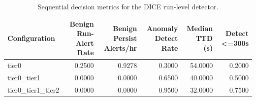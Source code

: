 \begin{table}[t]
\centering
\caption{Sequential decision metrics for the DICE run-level detector.}
\label{tab:dice_sequential_metrics}
\footnotesize
\begin{tabular}{lrrrrr}
\toprule
Configuration & Benign Run-Alert Rate & Benign Persist Alerts/hr & Anomaly Detect Rate & Median TTD (s) & Detect <=300s \\
\midrule
tier0 & 0.2500 & 0.9278 & 0.3000 & 54.0000 & 0.2000 \\
tier0_tier1 & 0.0000 & 0.0000 & 0.6500 & 40.0000 & 0.5000 \\
tier0_tier1_tier2 & 0.0000 & 0.0000 & 0.9500 & 32.0000 & 0.7500 \\
\bottomrule
\end{tabular}

\end{table}
